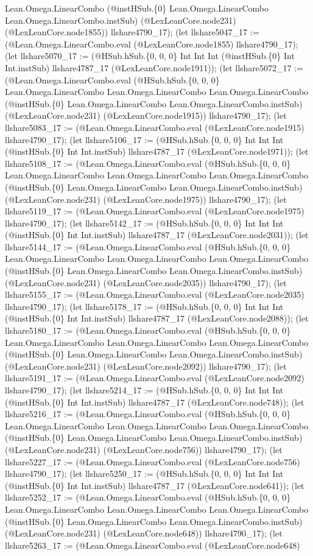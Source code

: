 \documentclass[11pt]{article}
\begin{document}
Lean.Omega.LinearCombo (@instHSub.\{0\} Lean.Omega.LinearCombo Lean.Omega.LinearCombo.instSub) (@LexLeanCore.node231) (@LexLeanCore.node1855)) llshare4790\_17); (let llshare5047\_17 := (@Lean.Omega.LinearCombo.eval (@LexLeanCore.node1855) llshare4790\_17); (let llshare5070\_17 := (@HSub.hSub.\{0, 0, 0\} Int Int Int (@instHSub.\{0\} Int Int.instSub) llshare4787\_17 (@LexLeanCore.node1911)); (let llshare5072\_17 := (@Lean.Omega.LinearCombo.eval (@HSub.hSub.\{0, 0, 0\} Lean.Omega.LinearCombo Lean.Omega.LinearCombo Lean.Omega.LinearCombo (@instHSub.\{0\} Lean.Omega.LinearCombo Lean.Omega.LinearCombo.instSub) (@LexLeanCore.node231) (@LexLeanCore.node1915)) llshare4790\_17); (let llshare5083\_17 := (@Lean.Omega.LinearCombo.eval (@LexLeanCore.node1915) llshare4790\_17); (let llshare5106\_17 := (@HSub.hSub.\{0, 0, 0\} Int Int Int (@instHSub.\{0\} Int Int.instSub) llshare4787\_17 (@LexLeanCore.node1971)); (let llshare5108\_17 := (@Lean.Omega.LinearCombo.eval (@HSub.hSub.\{0, 0, 0\} Lean.Omega.LinearCombo Lean.Omega.LinearCombo Lean.Omega.LinearCombo (@instHSub.\{0\} Lean.Omega.LinearCombo Lean.Omega.LinearCombo.instSub) (@LexLeanCore.node231) (@LexLeanCore.node1975)) llshare4790\_17); (let llshare5119\_17 := (@Lean.Omega.LinearCombo.eval (@LexLeanCore.node1975) llshare4790\_17); (let llshare5142\_17 := (@HSub.hSub.\{0, 0, 0\} Int Int Int (@instHSub.\{0\} Int Int.instSub) llshare4787\_17 (@LexLeanCore.node2031)); (let llshare5144\_17 := (@Lean.Omega.LinearCombo.eval (@HSub.hSub.\{0, 0, 0\} Lean.Omega.LinearCombo Lean.Omega.LinearCombo Lean.Omega.LinearCombo (@instHSub.\{0\} Lean.Omega.LinearCombo Lean.Omega.LinearCombo.instSub) (@LexLeanCore.node231) (@LexLeanCore.node2035)) llshare4790\_17); (let llshare5155\_17 := (@Lean.Omega.LinearCombo.eval (@LexLeanCore.node2035) llshare4790\_17); (let llshare5178\_17 := (@HSub.hSub.\{0, 0, 0\} Int Int Int (@instHSub.\{0\} Int Int.instSub) llshare4787\_17 (@LexLeanCore.node2088)); (let llshare5180\_17 := (@Lean.Omega.LinearCombo.eval (@HSub.hSub.\{0, 0, 0\} Lean.Omega.LinearCombo Lean.Omega.LinearCombo Lean.Omega.LinearCombo (@instHSub.\{0\} Lean.Omega.LinearCombo Lean.Omega.LinearCombo.instSub) (@LexLeanCore.node231) (@LexLeanCore.node2092)) llshare4790\_17); (let llshare5191\_17 := (@Lean.Omega.LinearCombo.eval (@LexLeanCore.node2092) llshare4790\_17); (let llshare5214\_17 := (@HSub.hSub.\{0, 0, 0\} Int Int Int (@instHSub.\{0\} Int Int.instSub) llshare4787\_17 (@LexLeanCore.node748)); (let llshare5216\_17 := (@Lean.Omega.LinearCombo.eval (@HSub.hSub.\{0, 0, 0\} Lean.Omega.LinearCombo Lean.Omega.LinearCombo Lean.Omega.LinearCombo (@instHSub.\{0\} Lean.Omega.LinearCombo Lean.Omega.LinearCombo.instSub) (@LexLeanCore.node231) (@LexLeanCore.node756)) llshare4790\_17); (let llshare5227\_17 := (@Lean.Omega.LinearCombo.eval (@LexLeanCore.node756) llshare4790\_17); (let llshare5250\_17 := (@HSub.hSub.\{0, 0, 0\} Int Int Int (@instHSub.\{0\} Int Int.instSub) llshare4787\_17 (@LexLeanCore.node641)); (let llshare5252\_17 := (@Lean.Omega.LinearCombo.eval (@HSub.hSub.\{0, 0, 0\} Lean.Omega.LinearCombo Lean.Omega.LinearCombo Lean.Omega.LinearCombo (@instHSub.\{0\} Lean.Omega.LinearCombo Lean.Omega.LinearCombo.instSub) (@LexLeanCore.node231) (@LexLeanCore.node648)) llshare4790\_17); (let llshare5263\_17 := (@Lean.Omega.LinearCombo.eval (@LexLeanCore.node648) 
\end{document}
